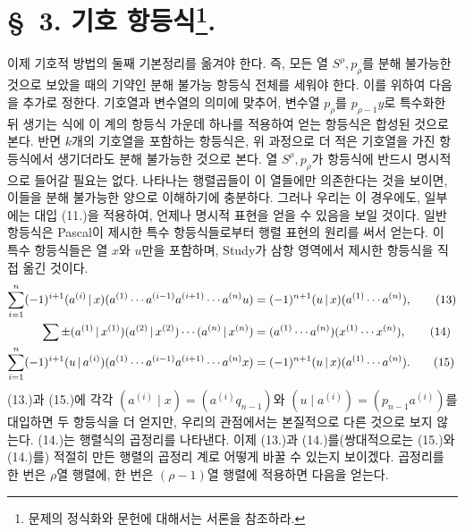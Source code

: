 \section*{\S\ 3. 기호 항등식\footnote{문제의 정식화와 문헌에 대해서는 서론을 참조하라.}.}
이제 기호적 방법의 둘째 기본정리를 옮겨야 한다. 즉, 모든 열 $S^\rho,p_\rho$를 분해 불가능한 것으로 보았을 때의 기약인 분해 불가능 항등식 전체를 세워야 한다. 이를 위하여 다음을 추가로 정한다. 기호열과 변수열의 의미에 맞추어, 변수열 $p_\rho$를 $p_{\rho-1}y$로 특수화한 뒤 생기는 식에 이 계의 항등식 가운데 하나를 적용하여 얻는 항등식은 합성된 것으로 본다. 반면 $k$개의 기호열을 포함하는 항등식은, 위 과정으로 더 적은 기호열을 가진 항등식에서 생기더라도 분해 불가능한 것으로 본다. 열 $S^\rho,p_\rho$가 항등식에 반드시 명시적으로 들어갈 필요는 없다. 나타나는 행렬곱들이 이 열들에만 의존한다는 것을 보이면, 이들을 분해 불가능한 양으로 이해하기에 충분하다. 그러나 우리는 이 경우에도, 일부에는 대입 (11.)을 적용하여, 언제나 명시적 표현을 얻을 수 있음을 보일 것이다. 일반 항등식은 Pascal이 제시한 특수 항등식들로부터 행렬 표현의 원리를 써서 얻는다. 이 특수 항등식들은 열 $x$와 $u$만을 포함하며, Study가 삼항 영역에서 제시한 항등식을 직접 옮긴 것이다.
\begin{align}
\sum_{i=1}^n(-1)^{i+1}(a^{(i)}\,|\,x)(a^{(1)}\cdots a^{(i-1)}a^{(i+1)}\cdots a^{(n)}u)&=(-1)^{n+1}(u\,|\,x)(a^{(1)}\cdots a^{(n)}),\tag{13}\\
\sum\pm(a^{(1)}\,|\,x^{(1)})(a^{(2)}\,|\,x^{(2)})\cdots(a^{(n)}\,|\,x^{(n)})&=(a^{(1)}\cdots a^{(n)})(x^{(1)}\cdots x^{(n)}),\tag{14}\\
\sum_{i=1}^n(-1)^{i+1}(u\,|\,a^{(i)})(a^{(1)}\cdots a^{(i-1)}a^{(i+1)}\cdots a^{(n)}x)&=(-1)^{n+1}(u\,|\,x)(a^{(1)}\cdots a^{(n)}).\tag{15}
\end{align}
(13.)과 (15.)에 각각 $(a^{(i)}\mid x)=(a^{(i)}q_{n-1})$와 $(u\mid a^{(i)})=(p_{n-1}a^{(i)})$를 대입하면 두 항등식을 더 얻지만, 우리의 관점에서는 본질적으로 다른 것으로 보지 않는다. (14.)는 행렬식의 곱정리를 나타낸다. 이제 (13.)과 (14.)를(쌍대적으로는 (15.)와 (14.)를) 적절히 만든 행렬의 곱정리 계로 어떻게 바꿀 수 있는지 보이겠다. 곱정리를 한 번은 $\rho$열 행렬에, 한 번은 $(\rho-1)$열 행렬에 적용하면 다음을 얻는다.

